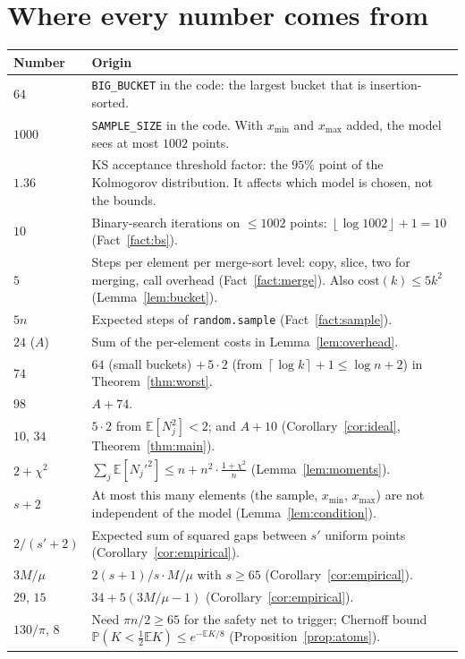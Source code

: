 \documentclass[11pt]{article}
\theoremstyle{definition}
\theoremstyle{remark}
\newcommand{\E}{\mathbb{E}}
\newcommand{\Prob}{\mathbb{P}}
\newcommand{\ceil}[1]{\left\lceil #1 \right\rceil}
\newcommand{\floor}[1]{\left\lfloor #1 \right\rfloor}
\newcommand{\code}[1]{\texttt{#1}}
\newcommand{\xmin}{x_{\min}}
\newcommand{\xmax}{x_{\max}}
\begin{document}
\appendix
\section{Where every number comes from}
\renewcommand{\arraystretch}{1.2}
\begin{longtable}{@{}>{\raggedright}p{}p{}@{}}
\toprule
Number & Origin\\
\midrule
\endhead
$64$ & \code{BIG\_BUCKET} in the code: the largest bucket that is insertion-sorted.\\
$1000$ & \code{SAMPLE\_SIZE} in the code. With $\xmin$ and $\xmax$ added, the model sees at most $1002$ points.\\
$1.36$ & KS acceptance threshold factor: the $95\%$ point of the Kolmogorov distribution. It affects which model is chosen, not the bounds.\\
$10$ & Binary-search iterations on $\le1002$ points: $\floor{\log1002}+1=10$ (Fact~\ref{fact:bs}).\\
$5$ & Steps per element per merge-sort level: copy, slice, two for merging, call overhead (Fact~\ref{fact:merge}). Also $\mathrm{cost}(k)\le5k^2$ (Lemma~\ref{lem:bucket}).\\
$5n$ & Expected steps of \code{random.sample} (Fact~\ref{fact:sample}).\\
$24$ ($A$) & Sum of the per-element costs in Lemma~\ref{lem:overhead}.\\
$74$ & $64$ (small buckets) $+\,5\cdot2$ (from $\ceil{\log k}+1\le\log n+2$) in Theorem~\ref{thm:worst}.\\
$98$ & $A+74$.\\
$10$, $34$ & $5\cdot2$ from $\E[N_j^2]<2$; and $A+10$ (Corollary~\ref{cor:ideal}, Theorem~\ref{thm:main}).\\
$2+\chi^2$ & $\sum_j\E[N_j'^2]\le n+n^2\cdot\frac{1+\chi^2}{n}$ (Lemma~\ref{lem:moments}).\\
$s+2$ & At most this many elements (the sample, $\xmin$, $\xmax$) are not independent of the model (Lemma~\ref{lem:condition}).\\
$2/(s'+2)$ & Expected sum of squared gaps between $s'$ uniform points (Corollary~\ref{cor:empirical}).\\
$3M/\mu$ & $2(s+1)/s\cdot M/\mu$ with $s\ge65$ (Corollary~\ref{cor:empirical}).\\
$29$, $15$ & $34+5(3M/\mu-1)$ (Corollary~\ref{cor:empirical}).\\
$130/\pi$, $8$ & Need $\pi n/2\ge65$ for the safety net to trigger; Chernoff bound $\Prob(K<\tfrac12\E K)\le e^{-\E K/8}$ (Proposition~\ref{prop:atoms}).\\
\bottomrule
\end{longtable}
\end{document}
